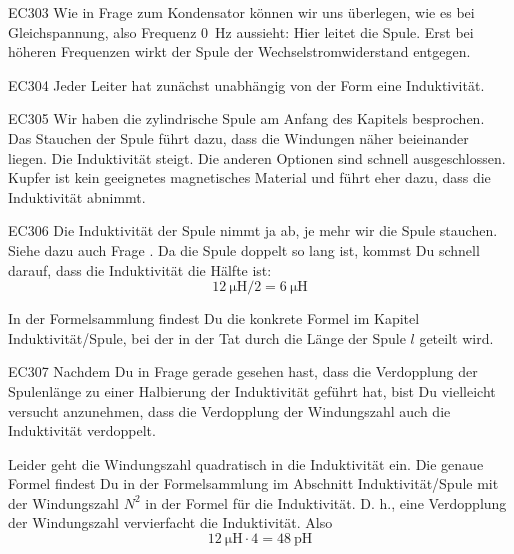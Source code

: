 \begin{sol}{EC303}
  Wie in Frage  zum Kondensator können wir uns überlegen, wie es bei Gleichspannung, also Frequenz \SI{0}{\hertz} aussieht: Hier leitet die Spule. Erst bei höheren Frequenzen wirkt der Spule der Wechselstromwiderstand entgegen.
\end{sol}

\begin{sol}{EC304}
  Jeder Leiter hat zunächst unabhängig von der Form eine Induktivität.
\end{sol}

\begin{sol}{EC305}
  Wir haben die zylindrische Spule am Anfang des Kapitels besprochen. Das Stauchen der Spule führt dazu, dass die Windungen näher beieinander liegen. Die Induktivität steigt.
  Die anderen Optionen sind schnell ausgeschlossen. Kupfer ist kein geeignetes magnetisches Material und führt eher dazu, dass die Induktivität abnimmt.
\end{sol}

\begin{sol}{EC306}
  Die Induktivität der Spule nimmt ja ab, je mehr wir die Spule stauchen. Siehe dazu auch Frage . 
  Da die Spule doppelt so lang ist, kommst Du schnell darauf, dass die Induktivität die Hälfte ist: $$\SI{12}{\micro\henry} / 2 = \SI{6}{\micro\henry}$$

  In der Formelsammlung findest Du die konkrete Formel im Kapitel Induktivität/Spule, bei der in der Tat durch die Länge der Spule $l$ geteilt wird.
\end{sol}

\begin{sol}{EC307}
 Nachdem Du in Frage  gerade gesehen hast, dass die Verdopplung der Spulenlänge zu einer Halbierung der Induktivität geführt hat, bist Du vielleicht versucht anzunehmen, dass die Verdopplung der Windungszahl auch die Induktivität verdoppelt. 
 
 Leider geht die Windungszahl quadratisch in die Induktivität ein.
 Die genaue Formel findest Du in der Formelsammlung im Abschnitt Induktivität/Spule mit der Windungszahl $N^2$ in der Formel für die Induktivität. D. h., eine Verdopplung der Windungszahl vervierfacht die Induktivität. Also $$\SI{12}{\micro\henry} \cdot 4 = \SI{48}{\pico\henry}$$
\end{sol}


